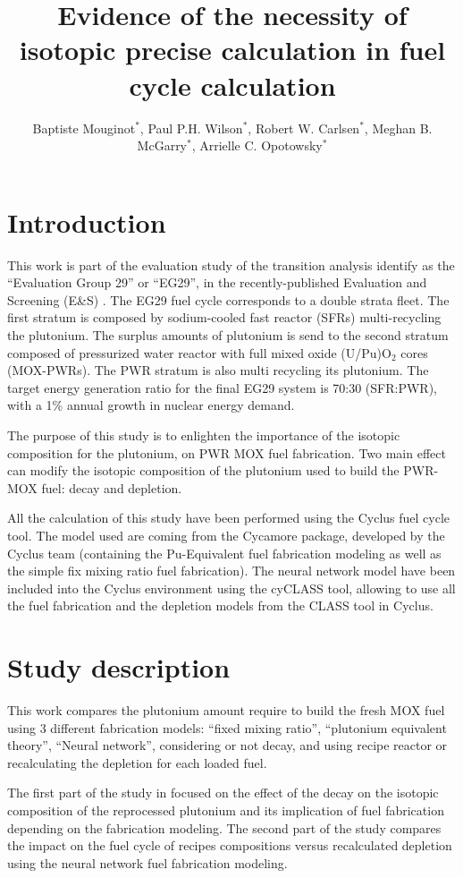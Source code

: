 \documentclass{anstrans}
\title{Evidence of the necessity of isotopic precise calculation in fuel cycle
calculation}
\author{Baptiste Mouginot$^{*}$, Paul P.H. Wilson$^{*}$, Robert W. Carlsen$^{*}$, Meghan B. McGarry$^{*}$,
Arrielle C. Opotowsky$^{*}$ }
\institute{
$^{*}$University of Wisconsin-Madison, WI
\and
}
\begin{document}
\section{Introduction} 

This work is part of the evaluation study of the transition analysis
\cite{Bo} identify as the ``Evaluation Group 29'' or ``EG29'', in the
recently-published Evaluation and Screening (E\&S) \cite{ES}.  The EG29 fuel
cycle corresponds to a double strata fleet. The first stratum is composed by
sodium-cooled fast reactor (SFRs) multi-recycling the plutonium. The surplus
amounts of plutonium is send to the second stratum composed of pressurized water
reactor with full mixed oxide (U/Pu)O$_{2}$ cores (MOX-PWRs).  The PWR stratum
is also multi recycling its plutonium. The target energy generation ratio for
the final EG29 system is 70:30 (SFR:PWR), with a 1\% annual growth in nuclear
energy demand.

The purpose of this study is to enlighten the importance of the isotopic
composition for the plutonium, on PWR MOX fuel fabrication. Two main effect can
modify the isotopic composition of the plutonium used to build the PWR-MOX fuel:
decay and depletion.

All the calculation of this study have been performed using the Cyclus fuel
cycle tool\cite{CYCLUS}. The model used are coming from the Cycamore package,
developed by the Cyclus team (containing the Pu-Equivalent fuel fabrication
modeling as well as the simple fix mixing ratio fuel fabrication). The neural
network model have been included into the Cyclus environment using the cyCLASS
tool, allowing to use all the fuel fabrication and the depletion models from the
CLASS tool \cite{CLASS} in Cyclus.


\section{Study description}

This work compares the plutonium amount require to build the fresh MOX fuel
using 3 different fabrication models: ``fixed mixing ratio'', ``plutonium
equivalent theory'', ``Neural network''\cite{Leniau2015125}, considering or not
decay, and using recipe reactor or recalculating the depletion for each loaded
fuel.

The first part of the study in focused on the effect of the decay on the
isotopic composition of the reprocessed plutonium and its implication of fuel
fabrication depending on the fabrication modeling. The second part of the study
compares the impact on the fuel cycle of recipes compositions versus
recalculated depletion using the neural network fuel fabrication modeling. 
\end{document}
